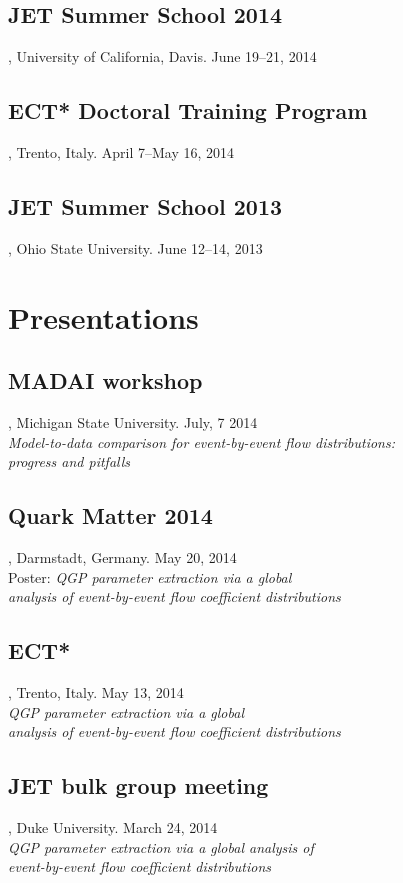 \documentclass[letterpaper,10pt]{article}
\begin{document}
\subsection{JET Summer School 2014}, University of California, Davis. \hfill June 19--21, 2014

\subsection{ECT* Doctoral Training Program}, Trento, Italy. \hfill April 7--May 16, 2014

\subsection{JET Summer School 2013}, Ohio State University. \hfill June 12--14, 2013



\section{Presentations}


\subsection{MADAI workshop}, Michigan State University. \hfill July, 7 2014 \\
\emph{Model-to-data comparison for event-by-event flow distributions: \\ progress and pitfalls}

\subsection{Quark Matter 2014}, Darmstadt, Germany. \hfill May 20, 2014 \\
Poster: \emph{QGP parameter extraction via a global \\ analysis of event-by-event flow coefficient distributions}

\subsection{ECT*}, Trento, Italy. \hfill May 13, 2014 \\
\emph{QGP parameter extraction via a global \\ analysis of event-by-event flow coefficient distributions}

\subsection{JET bulk group meeting}, Duke University. \hfill March 24, 2014 \\
\emph{QGP parameter extraction via a global analysis of \\ event-by-event flow coefficient distributions}
\end{document}
